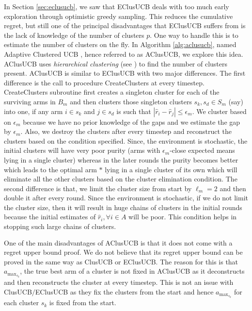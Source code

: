 In Section \ref{sec:eclusucb}, we saw that EClusUCB deals with too much early exploration through optimistic greedy sampling. This reduces the cumulative regret, but still one of the principal disadvantages that EClusUCB suffers from is the lack of knowledge of the number of clusters $p$. One way to handle this is to estimate the number of clusters on the fly. In Algorithm \ref{alg:aclusucb}, named Adaptive Clustered UCB , hence referred to as AClusUCB, we explore this idea. AClusUCB uses \emph{hierarchical clustering} (see \cite{friedman2001elements}) to find the number of clusters present. AClusUCB is similar to EClusUCB with two major differences. The first difference is the call to procedure CreateClusters at every timestep. CreateClusters subroutine first creates a singleton cluster for each of the surviving arms in $B_{m}$ and then clusters those singleton clusters $s_{k}, s_{d}\in S_{m}$ (say) into one, if any arm $i\in s_{k}$ and $j\in s_{d}$ is such that $|\hat{r}_{i}-\hat{r}_{j}|\leq \epsilon_{m}$. We cluster based on $\epsilon_{m}$ because we have no prior knowledge of the gaps and we estimate the gap by $\epsilon_{m}$. Also, we destroy the clusters after every timestep and reconstruct the clusters based on the condition specified. Since, the environment is stochastic, the initial clusters will have very poor purity (arms with $\epsilon_{m}$-close expected means lying in a single cluster) whereas in the later rounds the purity becomes better which leads to the optimal arm $*$ lying in a single cluster of its own which will eliminate all the other clusters based on the cluster elimination condition. The second difference is that, we limit the cluster size from start by $\ell_{m}=2$ and then double it after every round. Since the environment is stochastic, if we do not limit the cluster size, then it will result in huge chains of clusters in the initial rounds because the initial estimates of $\hat{r}_{i},\forall i\in A$ will be poor. This condition helps in stopping such large chains of clusters.  

One of the main disadvantages of AClusUCB is that it does not come with a regret upper bound proof. We do not believe that its regret upper bound can be proved in the same way as ClusUCB or EClusUCB. The reason for this is that $a_{\max_{s_{k}}}$, the true best arm of a cluster is not fixed in AClusUCB as it deconstructs and then reconstructs the cluster at every timestep. This is not an issue with ClusUCB$\big /$EClusUCB as they fix the clusters from the start and hence $a_{\max_{s_{k}}}$ for each cluster $s_k$ is fixed from the start.

